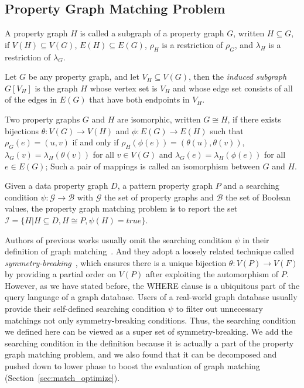 \subsection{Property Graph Matching Problem}
\begin{definition}[Subgraph]
  A property graph $H$ is called a subgraph of a property graph $G$, written $H \subseteq G$, if
  $V(H) \subseteq V(G)$, $E(H) \subseteq E(G)$, $\rho_H$ is a restriction of $\rho_G$, and $\lambda_H$ is a restriction of $\lambda_G$.
\end{definition}
Let $G$ be any property graph, and let $V_H \subseteq V(G)$, then the \emph{induced subgraph} $G[V_H]$ is the graph $H$ whose vertex set is $V_H$ and whose edge set consists of all of the edges in $E(G)$ that have both endpoints in $V_H$.
\begin{definition}
  Two property graphs $G$ and $H$ are isomorphic, written $G \cong H$,
  if there exists bijections $\theta: V(G) \rightarrow V(H)$ and $\phi: E(G) \rightarrow E(H)$ such that
  $\rho_G(e) = (u, v)$ if and only if $\rho_H(\phi(e)) = (\theta(u), \theta(v))$,
  $\lambda_G(v) = \lambda_H(\theta(v))$ for all $v \in V(G)$
  and $\lambda_G(e) = \lambda_H(\phi(e))$ for all $e \in E(G)$;
  Such a pair of mappings is called an isomorphism between $G$ and $H$.
\end{definition}
\begin{definition}\label{def:property_graph_matching}
  Given a data property graph $D$, a pattern property graph $P$ and a searching condition $\psi: \mathcal{G} \rightarrow \mathcal{B}$ with $\mathcal{G}$ the set of property graphs and $\mathcal{B}$ the set of Boolean values,
  the property graph matching problem is to report the set $\mathcal{I} = \{H | H \subseteq D, H \cong P, \psi(H) = true\}$.
\end{definition}
Authors of previous works usually omit the searching condition $\psi$ in their definition of graph matching~\cite{DBLP:conf/sigmod/ShaoCCMYX14,DBLP:journals/pvldb/LaiQLC15,DBLP:conf/sigmod/KimLBHLKJ16,DBLP:journals/pvldb/QiaoZC17}.
And they adopt a loosely related technique called \emph{symmetry-breaking}~\cite{DBLP:conf/recomb/GrochowK07},
which ensures there is a unique bijection $\theta: V(P) \rightarrow V(F)$ by providing a partial order on $V(P)$ after exploiting the automorphism of $P$.
However, as we have stated before, the WHERE clause is a ubiquitous part of the query language of a graph database.
Users of a real-world graph database usually provide their self-defined searching condition $\psi$ to filter out unnecessary matchings not only symmetry-breaking conditions.
Thus, the searching condition we defined here can be viewed as a super set of symmetry-breaking.
We add the searching condition in the definition because it is actually a part of the property graph matching problem,
and we also found that it can be decomposed and pushed down to lower phase to boost the evaluation of graph matching (Section~\ref{sec:match_optimize}).
